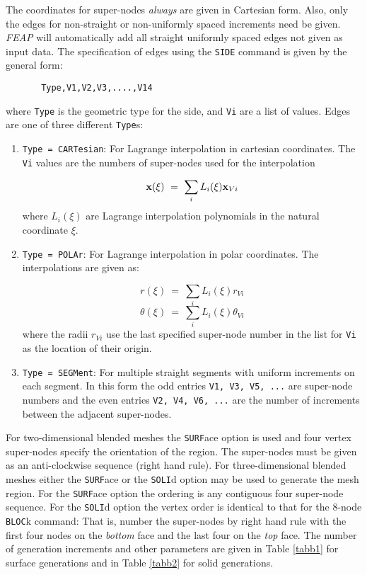 The coordinates for super-nodes {\it always} are given in Cartesian form.
Also, only the edges for non-straight or non-uniformly spaced increments
need be given.  {\sl FEAP} will automatically add all
straight uniformly spaced edges not given as input data.
The specification of edges using the {\tt SIDE} command is given by the
general form:
\begin{verbatim}
       Type,V1,V2,V3,....,V14
\end{verbatim}
where {\tt Type} is the geometric type for the
side, and {\tt Vi} are a list of values.
Edges are one of three different {\tt Type}s:
\begin{enumerate}
\item
{\tt Type = CARTesian}: For Lagrange interpolation in cartesian coordinates.
The {\tt Vi} values are the numbers of super-nodes used for the interpolation

$$\mathbf{x}(\xi) ~=~ \sum_i L_i(\xi) \mathbf{x}_{Vi}$$
where $L_i(\xi)$ are Lagrange interpolation polynomials in the natural
coordinate $\xi$.

\item
{\tt Type = POLAr}: For Lagrange interpolation in polar coordinates.  The
interpolations are given as:

$$r(\xi) ~=~ \sum_i L_i(\xi) r_{Vi}$$
$$\theta(\xi) ~=~ \sum_i L_i(\xi) \theta_{Vi}$$
where the radii $r_{Vi}$ use the last specified super-node number in the
list for {\tt Vi} as the location of their origin.

\item
{\tt Type = SEGMent}: For multiple straight segments with uniform increments
on each segment.  In this form the odd entries {\tt V1, V3, V5, ...}
are super-node numbers and the even entries {\tt V2, V4, V6, ...}
are the number of increments between the adjacent super-nodes.
\end{enumerate}

For two-dimensional blended meshes the {\tt SURF}ace option is used and 
four vertex super-nodes specify the orientation of the region.
The super-nodes must be given as an anti-clockwise sequence (right hand
rule).
For three-dimensional blended meshes either the {\tt SURF}ace or the
{\tt SOLI}d option may be used to generate the mesh region.  For the
{\tt SURF}ace option the ordering is any contiguous four super-node sequence.
For the {\tt SOLI}d option the vertex order is identical to that for the
8-node {\tt BLOC}k command: That is, number the super-nodes by right hand rule
with the first four nodes on the {\it bottom} face and the last four
on the {\it top} face.
The number of generation increments and other parameters are 
given in Table \ref{tabb1} for surface generations and in Table \ref{tabb2}
for solid generations.

